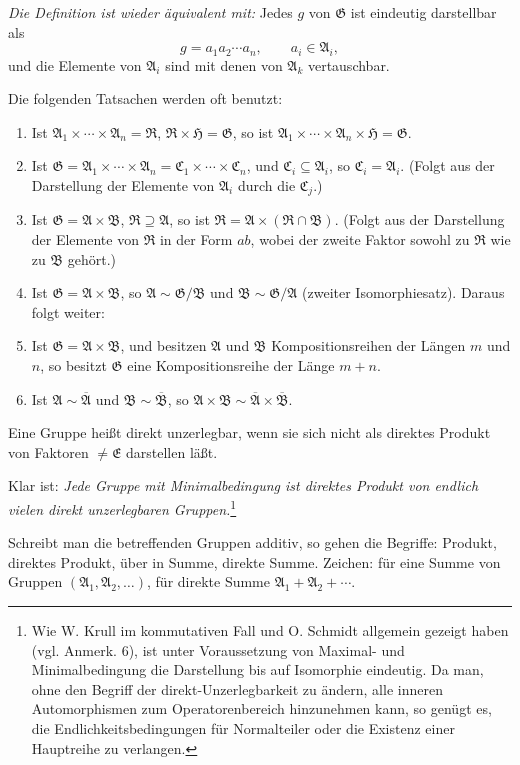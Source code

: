 \documentclass[11pt]{article}
\providecommand{\mG}{\mathfrak{G}}
\providecommand{\mA}{\mathfrak{A}}
\providecommand{\mB}{\mathfrak{B}}
\providecommand{\mC}{\mathfrak{C}}
\providecommand{\mE}{\mathfrak{E}}
\providecommand{\mH}{\mathfrak{H}}
\providecommand{\mR}{\mathfrak{R}}
\begin{document}
\emph{Die Definition ist wieder äquivalent mit:} Jedes $g$ von $\mG$ ist eindeutig darstellbar als
\[
        g=a_1a_2\cdots a_n,\qquad a_i\in\mA_i,
\]
und die Elemente von $\mA_i$ sind mit denen von $\mA_k$ vertauschbar.

Die folgenden Tatsachen werden oft benutzt:
\begin{enumerate}
\item Ist $\mA_1\times\cdots\times\mA_n=\mR$, $\mR\times\mH=\mG$, so ist $\mA_1\times\cdots\times\mA_n\times\mH=\mG$.
\item Ist $\mG=\mA_1\times\cdots\times\mA_n=\mC_1\times\cdots\times\mC_n$, und $\mC_i\subseteq\mA_i$, so $\mC_i=\mA_i$. (Folgt aus der Darstellung der Elemente von $\mA_i$ durch die $\mC_j$.)
\item Ist $\mG=\mA\times\mB$, $\mR\supseteq\mA$, so ist $\mR=\mA\times(\mR\cap\mB)$. (Folgt aus der Darstellung der Elemente von $\mR$ in der Form $ab$, wobei der zweite Faktor sowohl zu $\mR$ wie zu $\mB$ gehört.)
\item Ist $\mG=\mA\times\mB$, so $\mA\sim\mG/\mB$ und $\mB\sim\mG/\mA$ (zweiter Isomorphiesatz). Daraus folgt weiter:
\item Ist $\mG=\mA\times\mB$, und besitzen $\mA$ und $\mB$ Kompositionsreihen der Längen $m$ und $n$, so besitzt $\mG$ eine Kompositionsreihe der Länge $m+n$.
\item Ist $\mA\sim\overline{\mA}$ und $\mB\sim\overline{\mB}$, so $\mA\times\mB\sim\overline{\mA}\times\overline{\mB}$.
\end{enumerate}
Eine Gruppe heißt direkt unzerlegbar, wenn sie sich nicht als direktes Produkt von Faktoren $\ne\mE$ darstellen läßt.

Klar ist: \emph{Jede Gruppe mit Minimalbedingung ist direktes Produkt von endlich vielen direkt unzerlegbaren Gruppen.}\footnote{Wie W. Krull im kommutativen Fall und O. Schmidt allgemein gezeigt haben (vgl. Anmerk. 6), ist unter Voraussetzung von Maximal- und Minimalbedingung die Darstellung bis auf Isomorphie eindeutig. Da man, ohne den Begriff der direkt-Unzerlegbarkeit zu ändern, alle inneren Automorphismen zum Operatorenbereich hinzunehmen kann, so genügt es, die Endlichkeitsbedingungen für Normalteiler oder die Existenz einer Hauptreihe zu verlangen.}

Schreibt man die betreffenden Gruppen additiv, so gehen die Begriffe: Produkt, direktes Produkt, über in Summe, direkte Summe. Zeichen: für eine Summe von Gruppen $(\mA_1,\mA_2,\ldots)$, für direkte Summe $\mA_1+\mA_2+\cdots$.
\end{document}

